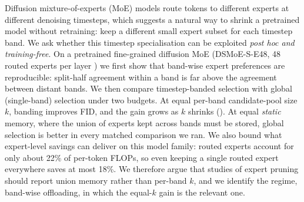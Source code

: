 Diffusion mixture-of-experts (MoE) models route tokens to different experts at different denoising timesteps, which suggests a natural way to shrink a pretrained model without retraining: keep a different small expert subset for each timestep band.
We ask whether this timestep specialisation can be exploited \emph{post hoc and training-free}.
On a pretrained fine-grained diffusion MoE (DSMoE-S-E48, 48 routed experts per layer \citep{liu2025dsmoe}) we first show that band-wise expert preferences are reproducible: split-half agreement within a band is far above the agreement between distant bands.
We then compare timestep-banded selection with global (single-band) selection under two budgets.
At equal per-band candidate-pool size $k$, banding improves FID, and the gain grows as $k$ shrinks ().
At equal \emph{static} memory, where the union of experts kept across bands must be stored, global selection is better in every matched comparison we ran.
We also bound what expert-level savings can deliver on this model family: routed experts account for only about 22\% of per-token FLOPs, so even keeping a single routed expert everywhere saves at most 18\%.
We therefore argue that studies of expert pruning should report union memory rather than per-band $k$, and we identify the regime, band-wise offloading, in which the equal-$k$ gain is the relevant one.
